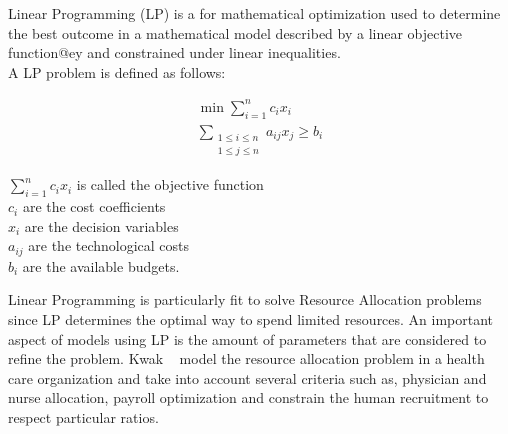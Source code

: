 Linear Programming (LP) is a for mathematical optimization used to determine the best outcome in a mathematical model described by a linear objective function@ey and constrained under linear inequalities.
\\A LP problem is defined as follows:

\begin{myquote}
\begin{equation*}
    \begin{aligned}
    \min \sum\limits_{i=1}^n c_{i}x_i\\
    \sum_{\substack{1 \leqslant i \leqslant n \\  1 \leqslant j \leqslant n}} a_{ij}x_j \geqslant b_i
    \end{aligned}
\end{equation*}

$\sum\limits_{i=1}^n c_{i}x_i$ is called the objective function\\
$c_i$ are the cost coefficients\\
$x_i$ are the decision variables\\
$a_{ij}$ are the technological costs\\
$b_i$ are the available budgets.
\end{myquote}


Linear Programming is particularly fit to solve Resource Allocation problems since LP determines the optimal way to spend limited resources.
An important aspect of models using LP is the amount of parameters that are considered to refine the problem. 
Kwak \etal~\cite{lpmedical-kwak1997} model the resource allocation problem in a health care organization and take into account several criteria such as, physician and nurse allocation, payroll optimization and constrain the human recruitment to respect particular ratios.

